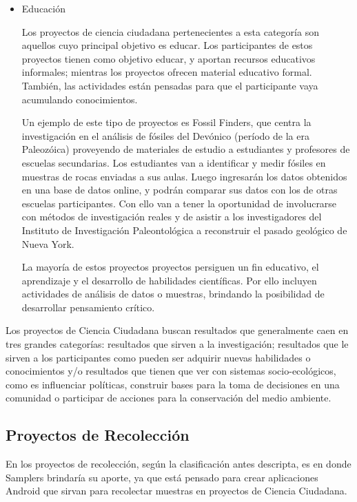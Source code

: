 \begin{itemize}
	\item {Educación} 
	
	Los proyectos de ciencia ciudadana pertenecientes a esta categoría son aquellos cuyo principal objetivo es educar. Los participantes de estos proyectos tienen como objetivo educar, y aportan recursos educativos informales; mientras los proyectos ofrecen material educativo formal. También, las actividades están pensadas para que el participante vaya acumulando conocimientos.
	
	Un ejemplo de este tipo de proyectos es Fossil Finders, que centra la investigación en el análisis de fósiles del Devónico (período de la era Paleozóica) proveyendo de materiales de estudio a estudiantes y profesores de escuelas secundarias. Los estudiantes van a identificar y medir fósiles en muestras de rocas enviadas a sus aulas. Luego ingresarán los datos obtenidos en una base de datos online, y podrán comparar sus datos con los de otras escuelas participantes. Con ello van a tener la oportunidad de involucrarse con métodos de investigación reales y de asistir a los investigadores del Instituto de Investigación Paleontológica a reconstruir el pasado geológico de Nueva York. \cite{FossilFinders}

	La mayoría de estos proyectos proyectos persiguen un fin educativo, el aprendizaje y el desarrollo de habilidades científicas. Por ello incluyen actividades de análisis de datos o muestras, brindando la posibilidad de desarrollar pensamiento crítico. 
	\end{itemize} 
	
	Los proyectos de Ciencia Ciudadana buscan resultados que generalmente caen en tres grandes categorías: resultados que sirven a la investigación; resultados que le sirven a los participantes como pueden ser adquirir nuevas habilidades o conocimientos y/o resultados que tienen que ver con sistemas socio-ecológicos, como es influenciar políticas, construir bases para la toma de decisiones en una comunidad o participar de acciones para la conservación del medio ambiente. \cite{shirk2012public}

\subsection{Proyectos de Recolección}	 
	En los proyectos de recolección, según la clasificación antes descripta, es en donde Samplers  brindaría su aporte, ya que está pensado para crear aplicaciones Android que sirvan para recolectar muestras en proyectos de Ciencia Ciudadana.
	
